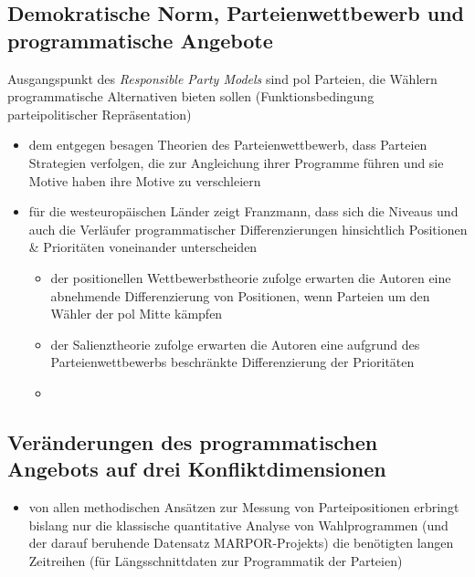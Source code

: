 \documentclass[11pt]{article}
\begin{document}
\subsection{Demokratische Norm, Parteienwettbewerb und programmatische Angebote}
\label{sec:orgab2c6cf}
Ausgangspunkt des \emph{Responsible Party Models} sind pol Parteien, die Wählern programmatische Alternativen bieten sollen (Funktionsbedingung parteipolitischer Repräsentation)
\begin{itemize}
\item dem entgegen besagen Theorien des Parteienwettbewerb, dass Parteien Strategien verfolgen, die zur Angleichung ihrer Programme führen und sie Motive haben ihre Motive zu verschleiern
\item für die westeuropäischen Länder zeigt Franzmann, dass sich die Niveaus und auch die Verläufer programmatischer Differenzierungen hinsichtlich Positionen \& Prioritäten voneinander unterscheiden
\begin{itemize}
\item der positionellen Wettbewerbstheorie zufolge erwarten die Autoren eine abnehmende Differenzierung von Positionen, wenn Parteien um den Wähler der pol Mitte kämpfen
\item der Salienztheorie zufolge erwarten die Autoren eine aufgrund des Parteienwettbewerbs beschränkte Differenzierung der Prioritäten
\item 
\end{itemize}
\end{itemize}

\subsection{Veränderungen des programmatischen Angebots auf drei Konfliktdimensionen}
\label{sec:org9ffd091}
\begin{itemize}
\item von allen methodischen Ansätzen zur Messung von Parteipositionen erbringt bislang nur die klassische quantitative Analyse von Wahlprogrammen (und der darauf beruhende Datensatz MARPOR-Projekts) die benötigten langen Zeitreihen (für Längsschnittdaten zur Programmatik der Parteien)
\end{itemize}
\end{document}
